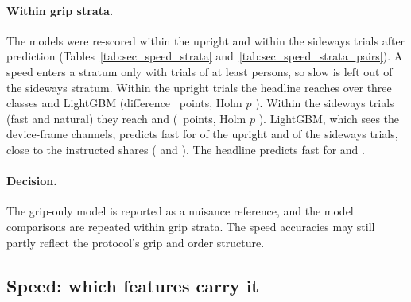 \paragraph{Within grip strata.} The models were re-scored within the upright and within the sideways trials after
prediction (Tables~\ref{tab:sec_speed_strata} and~\ref{tab:sec_speed_strata_pairs}). A speed enters a stratum only
with trials of at least  persons, so slow is left out of the sideways stratum. Within the
upright trials the headline reaches  over three classes and LightGBM
 (difference
~points, Holm $p$
). Within the sideways trials (fast and
natural) they reach  and 
(~points, Holm $p$
). LightGBM, which sees the
device-frame channels, predicts fast for  of the upright and
 of the sideways trials, close to the instructed shares
( and ). The headline
predicts fast for  and .

\paragraph{Decision.} The grip-only model is reported as a nuisance reference, and the model comparisons are
repeated within grip strata. The speed accuracies may still partly reflect the protocol's grip and order
structure.


\FloatBarrier
\subsection{Speed: which features carry it}\label{app:sec:speed-features}

